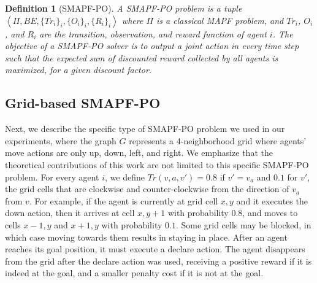 \documentclass[letterpaper]{article} %
\newcommand{\tuple}[1]{\ensuremath{\left \langle #1 \right \rangle }}
\newcommand{\roni}[1]{ }
\newtheorem{definition}{Definition}
\begin{document}
\begin{definition}[SMAPF-PO]
A SMAPF-PO problem is a tuple $\tuple{\Pi,BE,\{Tr_i\}_i, \{O_i\}_i, \{R_i\}_i}$ where $\Pi$ is a classical MAPF problem, and $Tr_i$, $O_i$, and $R_i$ are the transition, observation, and reward function of agent $i$. 
The objective of a SMAPF-PO solver is to output a joint action in every time step such that the expected sum of discounted reward collected by all agents is maximized, for a given discount factor. 
\end{definition}



\subsection{Grid-based SMAPF-PO}

Next, we describe the specific type of SMAPF-PO problem we used in our experiments, where the graph $G$ represents a 4-neighborhood grid where agents' move actions are only up, down, left, and right. We emphasize that the theoretical contributions of this work are not limited to this specific SMAPF-PO problem. 
For every agent $i$, we define $Tr(v,a,v')=0.8$ if $v'=v_a$ and $0.1$ for $v'$, the grid cells that are clockwise and counter-clockwise from the direction of $v_a$ from $v$. 
For example, if the agent is currently at grid cell $x,y$ and it executes the down action, then it arrives at cell $x,y+1$ with probability $0.8$, and moves to cells $x-1,y$ and $x+1,y$ with probability $0.1$.
Some grid cells may be blocked, in which case moving towards them results in staying in place. 
After an agent reaches its goal position, it must execute a declare action. The agent disappears from the grid after the declare action was used, receiving a positive reward if it is indeed at the goal, and a smaller penalty cost if it is not at the goal.  
\end{document}
